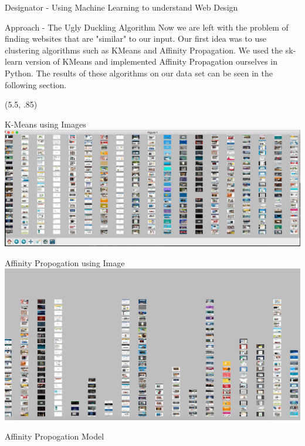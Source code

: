 \documentclass{beamer}
\begin{document}
\begin{frame}{\centerline{\Huge Designator - Using Machine Learning to understand Web Design}}
\begin{textblock}{5}
\begin{block}{Approach - The Ugly Duckling Algorithm}
Now we are left with the problem of finding websites that are "similar" to our input. Our first idea was to use
clustering algorithms such as KMeans and Affinity Propagation. We used the sk-learn version of KMeans and implemented
Affinity Propagation ourselves in Python. The results of these algorithms on our data set can be seen in the following
section.
\end{block}


\end{textblock}

\begin{textblock}{5}(5.5, .85)

\begin{block}{K-Means using Images}
\includegraphics[scale=.45]{imgkmeans.png}
\end{block}
\begin{block}{Affinity Propogation using Image}
\includegraphics[scale=.45]{affPropImg.jpg}
\end{block}
\begin{block}{Affinity Propogation Model}
\begin{figure}
\centering
{}
\end{figure}


\end{block}
\end{textblock}
\end{frame}
\end{document}

